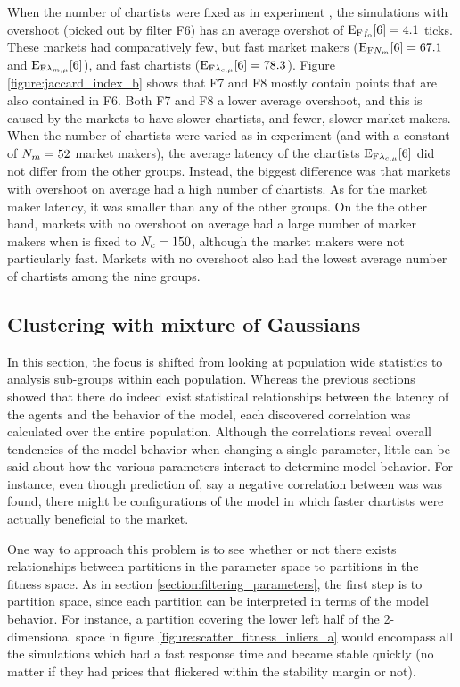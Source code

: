 When the number of chartists were fixed as in experiment \dten, the simulations with overshoot (picked out by filter F6) has an average overshot of $\mathrm{E}_\text{F{\ensuremath{f_\text{o}}}}[6] = 4.1$ ticks. These markets had comparatively few, but fast market makers ($\mathrm{E}_\text{F{\ensuremath{N_{m}}}}[6] = 67.1$ and $\mathrm{E}_\text{F{\ensuremath{\lambda_{m, \mu}}}}[6]$), and fast chartists ($\mathrm{E}_\text{F{\ensuremath{\lambda_{c, \mu}}}}[6] = 78.3$). Figure \ref{figure:jaccard_index_b} shows that F7 and F8 mostly contain points that are also contained in F6. Both F7 and F8 a lower average overshoot, and this is caused by the markets to have slower chartists, and fewer, slower market makers. When the number of chartists were varied as in experiment \deleven{} (and with a constant of $N_{m}=52$ market makers), the average latency of the chartists $\mathrm{E}_\text{F{\ensuremath{\lambda_{c, \mu}}}}[6]$ did not differ from the other groups. Instead, the biggest difference was that markets with overshoot on average had a high number of chartists. As for the market maker latency, it was smaller than any of the other groups. On the the other hand, markets with no overshoot on average had a large number of marker makers when \scnAgents is fixed to $N_{c} = 150$, although the market makers were not particularly fast. Markets with no overshoot also had the lowest average number of chartists among the nine groups.


\subsection{Clustering with mixture of Gaussians}
In this section, the focus is shifted from looking at population wide statistics to analysis sub-groups within each population. Whereas the previous sections showed that there do indeed exist statistical relationships between the latency of the agents and the behavior of the model, each discovered correlation was calculated over the entire population. Although the correlations reveal overall tendencies of the model behavior when changing a single parameter, little can be said about how the various parameters interact to determine model behavior. For instance, even though prediction of, say a negative correlation between \timetoreachnewfundamental was \sclatencymu was found, there might be configurations of the model in which faster chartists were actually beneficial to the market. 

One way to approach this problem is to see whether or not there exists relationships between partitions in the parameter space to partitions in the fitness space. As in section \ref{section:filtering_parameters}, the first step is to partition space, since each partition can be interpreted in terms of the model behavior. For instance, a partition covering the lower left half of the 2-dimensional space in figure \ref{figure:scatter_fitness_inliers_a} would encompass all the simulations which had a fast response time and became stable quickly (no matter if they had prices that flickered within the stability margin or not).

